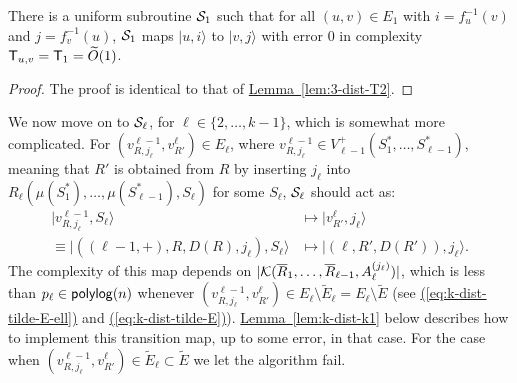 \documentclass{theoretics}
\newcommand{\eq}[1]{\hyperref[eq:#1]{(\ref*{eq:#1})}}
\newcommand{\lem}[1]{\hyperref[lem:#1]{Lemma~\ref*{lem:#1}}}
\def\ket#1{{\lvert}#1\rangle}
\renewcommand{\>}{\rangle}
\newcommand{\<}{\langle}
\renewcommand{\(}{\left(}
\renewcommand{\)}{\right)}
\begin{document}
\begin{lemma}\label{lem:k-dist-T2}
	There is a uniform subroutine ${\cal S}_1$ such that for all $(u,v)\in E_1$ with $i=f_u^{-1}(v)$ and $j=f_v^{-1}(u)$, ${\cal S}_1$ maps $\ket{u,i}$ to $\ket{v,j}$ with error 0 in complexity ${\sf T}_{u,v}={\sf T}_1=\widetilde{O}(1)$.
\end{lemma}
\begin{proof}
The proof is identical to that of \lem{3-dist-T2}.
\end{proof}

\noindent We now move on to ${\cal S}_{\ell}$, for $\ell \in \{2,\dots,k-1\}$, which is somewhat more complicated.
For $(v^{\ell-1}_{R,j_{\ell}},v^{\ell}_{R'})\in E_{\ell}$, where $v^{\ell-1}_{R,j_{\ell}}\in V_{\ell-1}^+(S_1^*,\dots,S_{\ell-1}^*)$, meaning that $R'$ is obtained from $R$ by inserting $j_{\ell}$ into $R_{\ell}(\mu(S_1^*),\dots,\mu(S_{\ell-1}^*),S_{\ell})$ for some $S_{\ell}$, ${\cal S}_{\ell}$ should act as:
\begin{equation}
\begin{split}
	\ket{v^{\ell-1}_{R,j_{\ell}},S_{\ell}} &\mapsto \ket{v^{\ell}_{R'},j_{\ell}}\\
\equiv \ket{(({\ell-1},+),R,D(R),j_{\ell}),S_{\ell}} &\mapsto \ket{(\ell,R',D(R')),j_{\ell}}.
	\end{split}\label{eq:kT3}
\end{equation}
The complexity of this map depends on $|{\cal K}(\overline{R}_1,\dots,\overline{R}_{\ell-1},A_{\ell}^{(j_{\ell})})|$, which is less than $p_{\ell}\in{\sf polylog}(n)$ whenever $(v^{\ell-1}_{R,j_{\ell}},v^{\ell}_{R'})\in E_{\ell}\setminus \tilde{E}_{\ell}=E_{\ell}\setminus\tilde{E}$ (see \eq{k-dist-tilde-E-ell} and \eq{k-dist-tilde-E}). \lem{k-dist-k1} below describes how to implement this transition map, up to some error, in that case. For the case when $(v^{\ell-1}_{R,j_{\ell}},v^{\ell}_{R'})\in \tilde{E}_{\ell}\subset \tilde{E}$ we let the algorithm fail.
\end{document}
